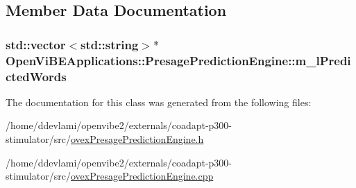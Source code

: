 \subsection{Member Data Documentation}
\hypertarget{classOpenViBEApplications_1_1PresagePredictionEngine_ae5f5089d4a66e00659833e526848ecf2}{
\subsubsection[{m\_\-lPredictedWords}]{\setlength{\rightskip}{0pt plus 5cm}std::vector$<$std::string$>$$\ast$ {\bf OpenViBEApplications::PresagePredictionEngine::m\_\-lPredictedWords}}}
\label{classOpenViBEApplications_1_1PresagePredictionEngine_ae5f5089d4a66e00659833e526848ecf2}


The documentation for this class was generated from the following files:\begin{DoxyCompactItemize}
\item 
/home/ddevlami/openvibe2/externals/coadapt-\/p300-\/stimulator/src/\hyperlink{ovexPresagePredictionEngine_8h}{ovexPresagePredictionEngine.h}\item 
/home/ddevlami/openvibe2/externals/coadapt-\/p300-\/stimulator/src/\hyperlink{ovexPresagePredictionEngine_8cpp}{ovexPresagePredictionEngine.cpp}\end{DoxyCompactItemize}
